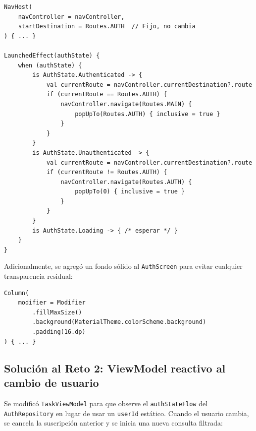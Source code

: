 \documentclass[12pt,a4paper]{article}
\begin{document}
\begin{lstlisting}[caption={Navegación reactiva sin re-composición del NavHost}]
NavHost(
    navController = navController,
    startDestination = Routes.AUTH  // Fijo, no cambia
) { ... }

LaunchedEffect(authState) {
    when (authState) {
        is AuthState.Authenticated -> {
            val currentRoute = navController.currentDestination?.route
            if (currentRoute == Routes.AUTH) {
                navController.navigate(Routes.MAIN) {
                    popUpTo(Routes.AUTH) { inclusive = true }
                }
            }
        }
        is AuthState.Unauthenticated -> {
            val currentRoute = navController.currentDestination?.route
            if (currentRoute != Routes.AUTH) {
                navController.navigate(Routes.AUTH) {
                    popUpTo(0) { inclusive = true }
                }
            }
        }
        is AuthState.Loading -> { /* esperar */ }
    }
}
\end{lstlisting}

Adicionalmente, se agregó un fondo sólido al \texttt{AuthScreen} para evitar cualquier transparencia residual:

\begin{lstlisting}[caption={Fondo sólido en AuthScreen}]
Column(
    modifier = Modifier
        .fillMaxSize()
        .background(MaterialTheme.colorScheme.background)
        .padding(16.dp)
) { ... }
\end{lstlisting}

\subsection{Solución al Reto 2: ViewModel reactivo al cambio de usuario}

Se modificó \texttt{TaskViewModel} para que observe el \texttt{authStateFlow} del \texttt{AuthRepository} en lugar de usar un \texttt{userId} estático. Cuando el usuario cambia, se cancela la suscripción anterior y se inicia una nueva consulta filtrada:
\end{document}
